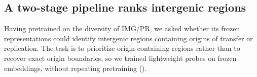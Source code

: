 %
%
%
%


\subsection*{A two-stage pipeline ranks intergenic regions}
\label{sec:origin}

Having pretrained \model on the diversity of IMG/PR, we asked whether its
frozen representations could identify intergenic regions containing origins
of transfer or replication. The task is to prioritize origin-containing
regions rather than to recover exact origin boundaries, so we trained
lightweight probes on frozen embeddings, without repeating pretraining
().

